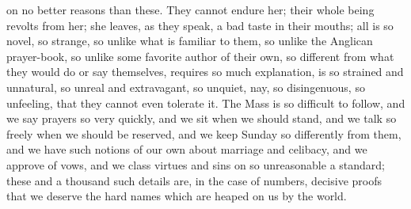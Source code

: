 on no better reasons than these. They cannot endure her;
their whole being revolts from her; she leaves, as they
speak, a bad taste in their mouths; all is so novel, so
strange, so unlike what is familiar to them, so unlike
the Anglican prayer-book, so unlike some favorite author
of their own, so different from what they would do or say
themselves, requires so much explanation, is so strained
and unnatural, so unreal and extravagant, so unquiet,
nay, so disingenuous, so unfeeling, that they cannot even
tolerate it. The Mass is so difficult to follow, and we
say prayers so very quickly, and we sit when we should
stand, and we talk so freely when we should be reserved,
and we keep Sunday so differently from them, and we have
such notions of our own about marriage and celibacy, and
we approve of vows, and we class virtues and sins on so
unreasonable a standard; these and a thousand such
details are, in the case of numbers, decisive proofs that
we deserve the hard names which are heaped on us by the
world.

